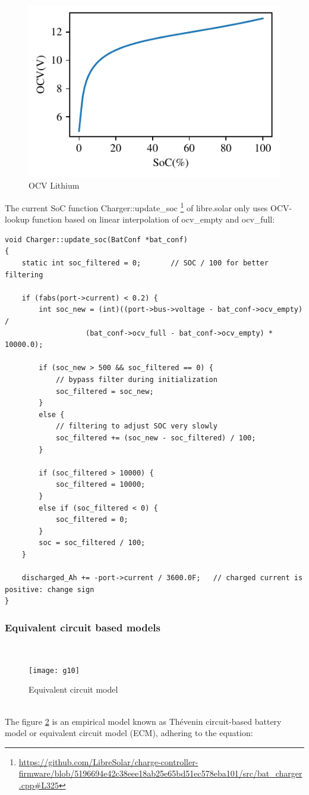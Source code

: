 \begin{figure}[!ht]
\centering
\includegraphics{OCVLion}
\caption{\label{fig:OCVLion} OCV Lithium }
\end{figure}

The current SoC function Charger::update\_soc \footnote{\url{https://github.com/LibreSolar/charge-controller-firmware/blob/5196694e42c38eee18ab25e65bd51ec578eba101/src/bat_charger.cpp\#L325}} of libre.solar only uses OCV-lookup function based on linear interpolation of 
ocv\_empty and  ocv\_full:

\begin{verbatim}
void Charger::update_soc(BatConf *bat_conf)
{
    static int soc_filtered = 0;       // SOC / 100 for better filtering

    if (fabs(port->current) < 0.2) {
        int soc_new = (int)((port->bus->voltage - bat_conf->ocv_empty) /
                   (bat_conf->ocv_full - bat_conf->ocv_empty) * 10000.0);

        if (soc_new > 500 && soc_filtered == 0) {
            // bypass filter during initialization
            soc_filtered = soc_new;
        }
        else {
            // filtering to adjust SOC very slowly
            soc_filtered += (soc_new - soc_filtered) / 100;
        }

        if (soc_filtered > 10000) {
            soc_filtered = 10000;
        }
        else if (soc_filtered < 0) {
            soc_filtered = 0;
        }
        soc = soc_filtered / 100;
    }

    discharged_Ah += -port->current / 3600.0F;   // charged current is positive: change sign
}
\end{verbatim}

\subsubsection{Equivalent circuit based models}
\
\
\
\begin{figure}[h!]
\begin{center}
\texttt{[image: g10]} %
\caption{\label{fig:ECMThevinModel} Equivalent circuit model }
\end{center} 
\end{figure} 
 \\
The figure \ref{fig:ECMThevinModel} is an empirical model known as Thévenin circuit-based battery model or equivalent circuit model (ECM), adhering to the equation: 

